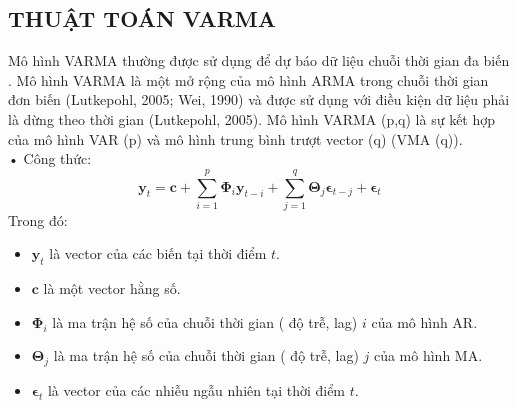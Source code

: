 \documentclass{article}
\begin{document}
\begin{multicols}{2}
\subsection{THUẬT TOÁN VARMA}
Mô hình VARMA thường được sử dụng để dự báo dữ liệu chuỗi thời gian đa biến . Mô hình VARMA là một mở rộng của mô hình ARMA trong chuỗi thời gian đơn biến (Lutkepohl, 2005; Wei, 1990) và được sử dụng với điều kiện dữ liệu phải là dừng theo thời gian (Lutkepohl, 2005). Mô hình VARMA (p,q) là sự kết hợp của mô hình VAR (p) và mô hình trung bình trượt vector (q) (VMA (q)).\\
 
    • Công thức:
    \begin{equation}
        \mathbf{y}_t = \mathbf{c} + \sum_{i=1}^{p} \mathbf{\Phi}_i \mathbf{y}_{t-i} + \sum_{j=1}^{q} \mathbf{\Theta}_j \boldsymbol{\epsilon}_{t-j} + \boldsymbol{\epsilon}_t
    \end{equation}  
Trong đó:  
    \begin{itemize}
      \item \( \mathbf{y}_t \) là vector của các biến tại thời điểm \( t \).
      \item \( \mathbf{c} \) là một vector hằng số.
      \item \( \mathbf{\Phi}_i \) là ma trận hệ số của chuỗi thời gian ( độ trễ, lag) \( i \) của mô hình AR.
      \item \( \mathbf{\Theta}_j \) là ma trận hệ số của chuỗi thời gian ( độ trễ, lag) \( j \) của mô hình MA.
      \item \( \boldsymbol{\epsilon}_t \) là vector của các nhiễu ngẫu nhiên tại thời điểm \( t \).
    \end{itemize} 

\end{multicols}
\end{document}
